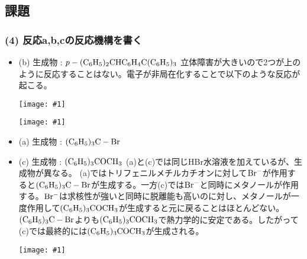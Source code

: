 \documentclass[a4paper,papersize,dvipdfmx]{jsarticle}
\newcommand{\pict}[2]{\begin{center} \texttt{[image: \#1]} \end{center}}   %
\begin{document}
\subsection*{課題}
\subsubsection*{(4) 反応a,b,cの反応機構を書く}
\begin{itemize}
\item (b) 生成物 : $p- \rm (C_6H_5)_2CHC_6H_4C(C_6H_5)_3$
立体障害が大きいので2つが上のように反応することはない。電子が非局在化することで以下のような反応が起こる。

\pict{imgs/6-1.jpeg}{7}
\pict{imgs/6-2.jpeg}{10}

\item (a) 生成物 : $\rm (C_6H_5)_3C-Br$
\item (c) 生成物 : $\rm (C_6H_5)_3COCH_3$
(a)と(c)では同じHBr水溶液を加えているが、生成物が異なる。
(a)ではトリフェニルメチルカチオンに対して$\rm Br^-$が作用すると$\rm (C_6H_5)_3C-Br$が生成する。一方(c)では$\rm Br^-$と同時にメタノールが作用する。$\rm Br^-$は求核性が強いと同時に脱離能も高いのに対し、メタノールが一度作用して$\rm (C_6H_5)_3COCH_3$が生成すると元に戻ることはほとんどない。$\rm (C_6H_5)_3C-Br$よりも$\rm (C_6H_5)_3COCH_3$で熱力学的に安定である。したがって(c)では最終的には$\rm (C_6H_5)_3COCH_3$が生成される。

\pict{imgs/6-3.jpg}{9}

\end{itemize}
\end{document}
